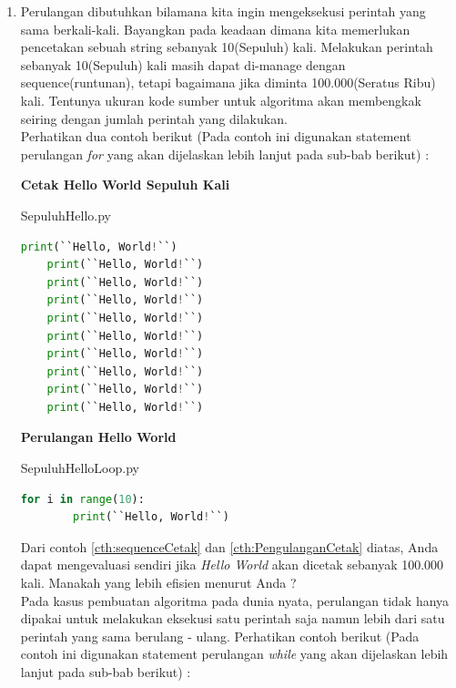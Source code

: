 \begin{enumerate}
	\item Perulangan dibutuhkan bilamana kita ingin mengeksekusi perintah yang sama berkali-kali. Bayangkan pada keadaan dimana kita memerlukan pencetakan sebuah string sebanyak 10(Sepuluh) kali. Melakukan perintah sebanyak 10(Sepuluh) kali masih dapat di-manage dengan sequence(runtunan), tetapi bagaimana jika diminta 100.000(Seratus Ribu) kali. Tentunya ukuran kode sumber untuk algoritma akan membengkak seiring dengan jumlah perintah yang dilakukan. \\ Perhatikan dua contoh berikut (Pada contoh ini digunakan statement perulangan \textit{for} yang akan dijelaskan lebih lanjut pada sub-bab berikut) :
	
\begin{contoh}
	\label{cth:sequenceCetak}
	\textbf{Cetak Hello World Sepuluh Kali}
\begin{listprog}{SepuluhHello.py}
\label{lst:SepuluhHello}
\begin{lstlisting}[language=Python]
	print(``Hello, World!``)
	print(``Hello, World!``)
	print(``Hello, World!``)
	print(``Hello, World!``)
	print(``Hello, World!``)
	print(``Hello, World!``)
	print(``Hello, World!``)
	print(``Hello, World!``)
	print(``Hello, World!``)
	print(``Hello, World!``)
\end{lstlisting}
\end{listprog}
\end{contoh}

\pagebreak

\begin{contoh}
	\label{cth:PengulanganCetak}
	\textbf{Perulangan Hello World}
\begin{listprog}{SepuluhHelloLoop.py}
\label{lst:SepuluhHelloLoop}
\begin{lstlisting}[language=Python]
	for i in range(10):
		print(``Hello, World!``)
\end{lstlisting}
\end{listprog}
\end{contoh}

Dari contoh \ref{cth:sequenceCetak} dan \ref{cth:PengulanganCetak} diatas, Anda dapat mengevaluasi sendiri jika \textit{Hello World} akan dicetak sebanyak 100.000 kali. Manakah yang lebih efisien menurut Anda ? \\ 
Pada kasus pembuatan algoritma pada dunia nyata, perulangan tidak hanya dipakai untuk melakukan eksekusi satu perintah saja namun lebih dari satu perintah yang sama berulang - ulang. Perhatikan contoh berikut (Pada contoh ini digunakan statement perulangan \textit{while} yang akan dijelaskan lebih lanjut pada sub-bab berikut) : 


\end{enumerate}
